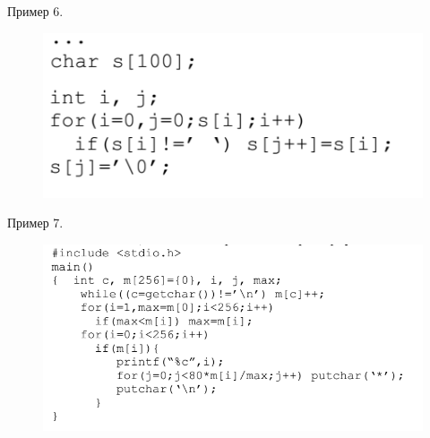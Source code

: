 \documentclass{beamer}
\begin{document}
\begin{frame}
Пример 6. 
\begin{figure}[h]
\centering
\includegraphics[scale=0.5]{images/lec02-pic10.png}
\end{figure}
\end{frame}

\begin{frame}
Пример 7. 
\begin{figure}[h]
\centering
\includegraphics[scale=0.5]{images/lec02-pic11.png}
\end{figure}
\end{frame}
\end{document}
